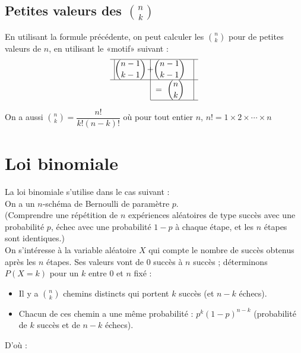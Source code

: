 \documentclass[a4paper,11pt]{article} \usepackage{FBarticle} \mapage{831}{Probabilités 1} %
\begin{document}
\begin{multicols}{2}
\subsection{Petites valeurs des ${n\choose k}$}
En utilisant la formule précédente, on peut calculer les $n\choose k$ pour de petites valeurs de $n$, en utilisant le «motif» suivant :
$$\begin{array}{c|cl}\hline
\vline \displaystyle{{n-1}\choose{k-1}} &\hspace{-3.15mm}+ \displaystyle{{n-1}\choose{k-1}} &\vline \\ \hline
&=~\displaystyle{n\choose k} &\vline \\ \cline{2-3}
\end{array}$$

\prop On a aussi ${n \choose k}=\dfrac{n!}{k!(n-k)!}$ où pour tout entier $n$, $n!=1\times2\times\cdots\times n$

\section{Loi binomiale}
La loi binomiale s'utilise dans le cas suivant :\\
On a un $n$-schéma de Bernoulli de paramètre $p$.\\
(Comprendre une répétition de $n$ expériences aléatoires de type succès avec une probabilité $p$, échec avec une probabilité $1-p$ à chaque étape, et les $n$ étapes sont identiques.)\\
On s'intéresse à la variable aléatoire $X$ qui compte le nombre de succès obtenus après les $n$ étapes. Ses valeurs vont de $0$ succès à $n$ succès ; déterminons $P(X=k)$ pour un $k$ entre $0$ et $n$ fixé :
\begin{itemize}
\item Il y a $n\choose k$ chemins distincts qui portent $k$ succès (et $n-k$ échecs).
\item Chacun de ces chemin a une même probabilité : $p^k(1-p)^{n-k}$ (probabilité de $k$ succès et de $n-k$ échecs).
\end{itemize}
D'où :

\end{multicols}
\end{document}
